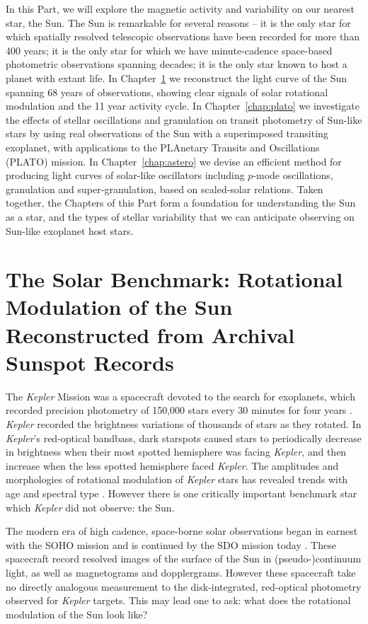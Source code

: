 \documentclass[12pt, twoside]{uwthesis}
\newcommand{\kepler}{\textsl{Kepler}\xspace}
\begin{document}
In this Part, we will explore the magnetic activity and variability on our nearest star, the Sun. The Sun is remarkable for several reasons -- it is the only star for which spatially resolved telescopic observations have been recorded for more than 400 years; it is the only star for which we have minute-cadence space-based photometric observations spanning decades; it is the only star known to host a planet with extant life. In Chapter~\ref{chap:solarbenchmark} we reconstruct the light curve of the Sun spanning 68 years of observations, showing clear signals of solar rotational modulation and the 11 year activity cycle. In Chapter~\ref{chap:plato} we investigate the effects of stellar oscillations and granulation on transit photometry of Sun-like stars by using real observations of the Sun with a superimposed transiting exoplanet, with applications to the PLAnetary Transits and Oscillations (PLATO) mission. In Chapter~\ref{chap:astero} we devise an efficient method for producing light curves of solar-like oscillators including $p$-mode oscillations, granulation and super-granulation, based on scaled-solar relations. Taken together, the Chapters of this Part form a foundation for understanding the Sun as a star, and the types of stellar variability that we can anticipate observing on Sun-like exoplanet host stars.     

\chapter{The Solar Benchmark: Rotational Modulation of the Sun Reconstructed from Archival Sunspot Records} \label{chap:solarbenchmark}

The \kepler Mission was a spacecraft devoted to the search for exoplanets, which recorded precision photometry of 150,000 stars every 30 minutes for four years \citep{Borucki2010}. \kepler recorded the brightness variations of thousands of stars as they rotated. In \kepler's red-optical bandbass, dark starspots caused stars to periodically decrease in brightness when their most spotted hemisphere was facing \kepler, and then increase when the less spotted hemisphere faced \kepler. The amplitudes and morphologies of rotational modulation of \kepler stars has revealed trends with age and spectral type \citep[e.g.][]{Basri2011,McQuillan2013,McQuillan2014,Notsu2013,Giles2017,Basri2018}. However there is one critically important benchmark star which \kepler did not observe: the Sun. 

The modern era of high cadence, space-borne solar observations began in earnest with the SOHO mission and is continued by the SDO mission today \citep{Domingo1995,Pesnell2012}. These spacecraft record resolved images of the surface of the Sun in (pseudo-)continuum light, as well as magnetograms and dopplergrams. However these spacecraft take no directly analogous measurement to the disk-integrated, red-optical photometry observed for \kepler targets. This may lead one to ask: what does the rotational modulation of the Sun look like? 
\end{document}
